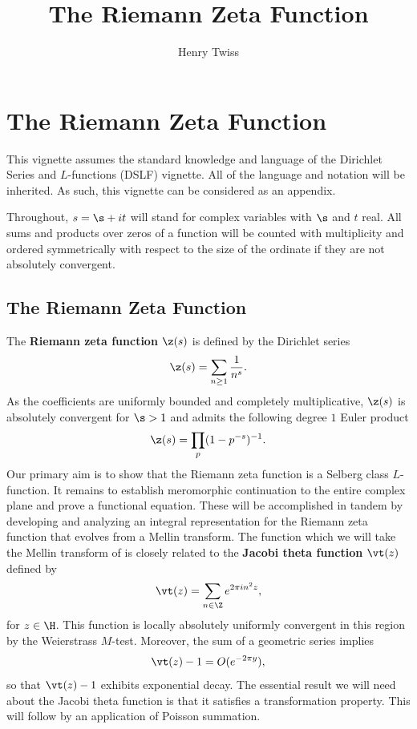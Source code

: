 \documentclass[12pt]{article}
\title{The Riemann Zeta Function}
\author{Henry Twiss}
\begin{document}
  \date{}
  \maketitle
  \tableofcontents
  \section{The Riemann Zeta Function}
    This vignette assumes the standard knowledge and language of the Dirichlet Series and \(L\)-functions (DSLF) vignette. All of the language and notation will be inherited. As such, this vignette can be considered as an appendix.

    Throughout, \(s = \s+it\) will stand for complex variables with \(\s\) and \(t\) real. All sums and products over zeros of a function will be counted with multiplicity and ordered symmetrically with respect to the size of the ordinate if they are not absolutely convergent.
    \subsection{The Riemann Zeta Function}
      The \textbf{Riemann zeta function} \(\z(s)\) is defined by the Dirichlet series
      \[
        \z(s) = \sum_{n \ge 1}\frac{1}{n^{s}}.
      \]
      As the coefficients are uniformly bounded and completely multiplicative, \(\z(s)\) is absolutely convergent for \(\s > 1\) and admits the following degree \(1\) Euler product
      \[
        \z(s) = \prod_{p}(1-p^{-s})^{-1}.
      \]
      Our primary aim is to show that the Riemann zeta function is a Selberg class \(L\)-function. It remains to establish meromorphic continuation to the entire complex plane and prove a functional equation. These will be accomplished in tandem by developing and analyzing an integral representation for the Riemann zeta function that evolves from a Mellin transform. The function which we will take the Mellin transform of is closely related to the \textbf{Jacobi theta function} \(\vt(z)\) defined by
      \[
        \vt(z) = \sum_{n \in \Z}e^{2\pi in^{2}z},
      \]
      for \(z \in \H\). This function is locally absolutely uniformly convergent in this region by the Weierstrass \(M\)-test. Moreover, the sum of a geometric series implies
      \[
        \vt(z)-1 = O(e^{-2\pi y}),
      \]
      so that \(\vt(z)-1\) exhibits exponential decay. The essential result we will need about the Jacobi theta function is that it satisfies a transformation property. This will follow by an application of Poisson summation.
\end{document}

